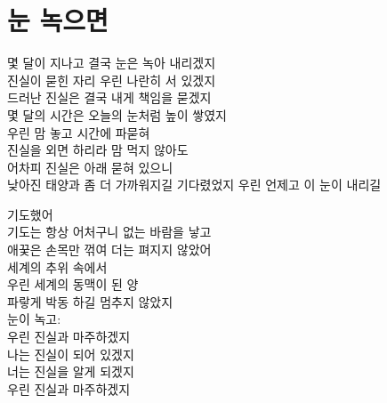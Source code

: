 \hypertarget{uxb208-uxb179uxc73cuxba74}{%

\section{눈 녹으면}\label{uxb208-uxb179uxc73cuxba74}}



몇 달이 지나고 결국 눈은 녹아 내리겠지\\

진실이 묻힌 자리 우린 나란히 서 있겠지\\

드러난 진실은 결국 내게 책임을 묻겠지\\

몇 달의 시간은 오늘의 눈처럼 높이 쌓였지\\

우린 맘 놓고 시간에 파묻혀\\

진실을 외면 하리라 맘 먹지 않아도\\

어차피 진실은 아래 묻혀 있으니\\

낮아진 태양과 좀 더 가까워지길 기다렸었지 우린 언제고 이 눈이 내리길

기도했어\\

기도는 항상 어처구니 없는 바람을 낳고\\

애꿎은 손목만 꺾여 더는 펴지지 않았어\\

세계의 추위 속에서\\

우린 세계의 동맥이 된 양\\

파랗게 박동 하길 멈추지 않았지\\

눈이 녹고:\\

우린 진실과 마주하겠지\\

나는 진실이 되어 있겠지\\

너는 진실을 알게 되겠지\\

우린 진실과 마주하겠지

